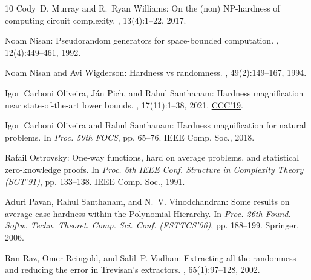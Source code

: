 \documentclass[11pt]{article}
\numberwithin{equation}{section}
\theoremstyle{definition}
\theoremstyle{plain}
\begin{document}
\begin{thebibliography}{10}
{\sc Cody~D. Murray and R.~Ryan Williams}: On the (non) {NP}-hardness of
  computing circuit complexity.
, 13(4):1--22, 2017.

{\sc Noam Nisan}: Pseudorandom generators for space-bounded computation.
, 12(4):449--461, 1992.
\newblock [\epfmtdoi{10.1007/BF01305237}]

{\sc Noam Nisan and Avi Wigderson}: Hardness vs randomness.
, 49(2):149--167, 1994.
\newblock [\epfmtdoi{10.1016/S0022-0000(05)80043-1}]

{\sc Igor~Carboni Oliveira, J{\'{a}}n Pich, and Rahul Santhanam}: Hardness
  magnification near state-of-the-art lower bounds.
, 17(11):1--38, 2021.
\newblock \prelim \href{https://doi.org/10.4230/LIPIcs.CCC.2019.27}{CCC'19}.

{\sc Igor~Carboni Oliveira and Rahul Santhanam}: Hardness magnification for
  natural problems.
\newblock In {\em Proc. 59th FOCS}, pp. 65--76. IEEE Comp. Soc., 2018.

{\sc Rafail Ostrovsky}: One-way functions, hard on average problems, and
  statistical zero-knowledge proofs.
\newblock In {\em Proc. 6th IEEE Conf. Structure in Complexity Theory
  (SCT'91)}, pp. 133--138. IEEE Comp. Soc., 1991.

{\sc Aduri Pavan, Rahul Santhanam, and N.~V. Vinodchandran}: Some results on
  average-case hardness within the {P}olynomial {H}ierarchy.
\newblock In {\em Proc. 26th Found. Softw. Techn. Theoret. Comp. Sci. Conf.
  (FSTTCS'06)}, pp. 188--199. Springer, 2006.
\newblock [\epfmtdoi{10.1007/11944836\_19}]

{\sc Ran Raz, Omer Reingold, and Salil~P. Vadhan}: Extracting all the
  randomness and reducing the error in {Trevisan's} extractors.
, 65(1):97--128, 2002.


\end{thebibliography}
\end{document}

